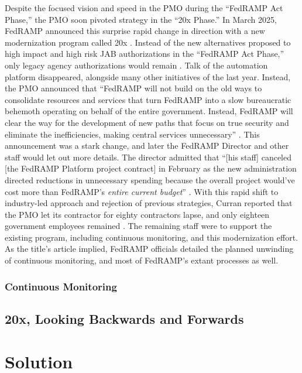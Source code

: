 \documentclass{jdf}
\begin{document}
Despite the focused vision and speed in the PMO during the ``FedRAMP Act Phase,'' the PMO soon pivoted strategy in the ``20x Phase.'' In March 2025, FedRAMP announced this surprise rapid change in direction with a new modernization program called 20x \citeyear{fedramp_blog_20x}. Instead of the new alternatives proposed to high impact and high risk JAB authorizations in the ``FedRAMP Act Phase,'' only legacy agency authorizations would remain \citeyear{fedramp_blog_20x}. Talk of the automation platform disappeared, alongside many other initiatives of the last year. Instead, the PMO announced that ``FedRAMP will not build on the old ways to consolidate resources and services that turn FedRAMP into a slow bureaucratic behemoth operating on behalf of the entire government. Instead, FedRAMP will clear the way for the development of new paths that focus on true security and eliminate the inefficiencies, making central services unnecessary'' \citeyear{fedramp_blog_20x}. This announcement was a stark change, and later the FedRAMP Director and other staff would let out more details. The director admitted that ``[his staff] canceled [the FedRAMP Platform project contract] in February as the new administration directed reductions in unnecessary spending because the overall project would've cost more than FedRAMP's \textit{entire current budget}'' \citeyear{20x_waterman_platform_comment}. With this rapid shift to industry-led approach and rejection of previous strategies, Curran reported that the PMO let its contractor for eighty contractors lapse, and only eighteen government employees remained \citeyear{curran25}. The remaining staff were to support the existing program, including continuous monitoring, and this modernization effort. As the title's article implied, FedRAMP officials detailed the planned unwinding of continuous monitoring, and most of FedRAMP's extant processes as well.

\subsubsection{Continuous Monitoring} \label{conmon}


\subsection{20x, Looking Backwards and Forwards}

\section{Solution}
\end{document}

